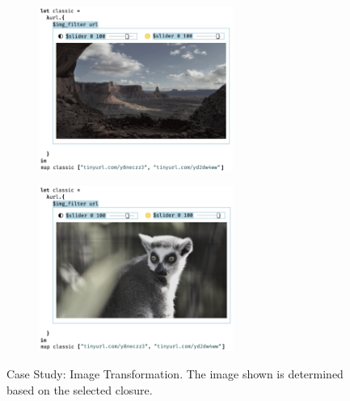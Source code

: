 \begin{figure}
  \begin{center}
    \begin{subfigure}[t]{0.5\textwidth}
      \centering
      \includegraphics[width=15pc]{img-filter-1.png}
      \caption{}
    \end{subfigure}\begin{subfigure}[t]{0.5\textwidth}
      \centering
      \includegraphics[width=15pc]{img-filter-2.png}
      \caption{}
    \end{subfigure}
  \end{center}
  \caption{Case Study: Image Transformation. The image shown is determined based on the selected closure.}
  \label{fig:img-transformation}
\end{figure}

